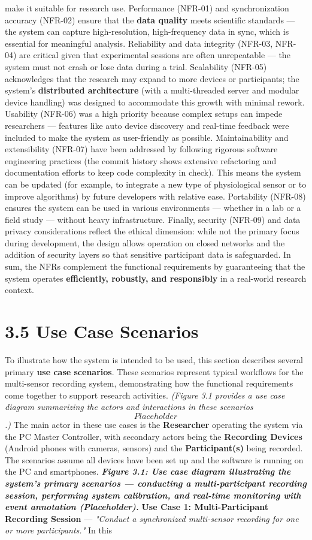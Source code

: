 make it suitable for research use. Performance (NFR-01) and synchronization accuracy (NFR-02) ensure that the \textbf{data quality} meets scientific standards --- the system can capture high-resolution, high-frequency data in sync, which is essential for meaningful analysis. Reliability and data integrity (NFR-03, NFR-04) are critical given that experimental sessions are often unrepeatable --- the system must not crash or lose data during a trial. Scalability (NFR-05) acknowledges that the research may expand to more devices or participants; the system's \textbf{distributed architecture} (with a multi-threaded server and modular device handling) was designed to accommodate this growth with minimal rework. Usability (NFR-06) was a high priority because complex setups can impede researchers --- features like auto device discovery and real-time feedback were included to make the system as user-friendly as possible. Maintainability and extensibility (NFR-07) have been addressed by following rigorous software engineering practices (the commit history shows extensive refactoring and documentation efforts to keep code complexity in check). This means the system can be updated (for example, to integrate a new type of physiological sensor or to improve algorithms) by future developers with relative ease. Portability (NFR-08) ensures the system can be used in various environments --- whether in a lab or a field study --- without heavy infrastructure. Finally, security (NFR-09) and data privacy considerations reflect the ethical dimension: while not the primary focus during development, the design allows operation on closed networks and the addition of security layers so that sensitive participant data is safeguarded. In sum, the NFRs complement the functional requirements by guaranteeing that the system operates \textbf{efficiently, robustly, and responsibly} in a real-world research context. \section{3.5 Use Case Scenarios} To illustrate how the system is intended to be used, this section describes several primary \textbf{use case scenarios}. These scenarios represent typical workflows for the multi-sensor recording system, demonstrating how the functional requirements come together to support research activities. \textit{(Figure 3.1 provides a use case diagram summarizing the actors and interactions in these scenarios \[Placeholder\].)} The main actor in these use cases is the \textbf{Researcher} operating the system via the PC Master Controller, with secondary actors being the \textbf{Recording Devices} (Android phones with cameras, sensors) and the \textbf{Participant(s)} being recorded. The scenarios assume all devices have been set up and the software is running on the PC and smartphones. \textit{\textbf{Figure 3.1: Use case diagram illustrating the system's primary scenarios --- conducting a multi-participant recording session, performing system calibration, and real-time monitoring with event annotation (Placeholder).}} \textbf{Use Case 1: Multi-Participant Recording Session} --- \textit{"Conduct a synchronized multi-sensor recording for one or more participants."} In this 